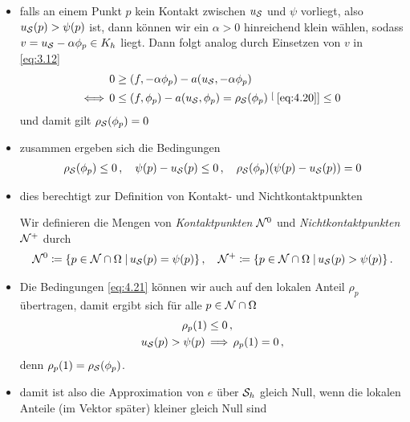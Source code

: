 \begin{itemize}
\item falls an einem Punkt $p$ kein Kontakt zwischen $u_{\mathcal S}$ und $\psi$ vorliegt, also $u_{\mathcal S} (p) > \psi(p)$ ist, dann können wir ein $\alpha > 0$ hinreichend klein wählen, sodass $v = u_{\mathcal S} - \alpha \phi_p \in K_h$ liegt. Dann folgt analog durch Einsetzen von $v$ in \eqref{eq:3.12}
\begin{align*}
	0 & \ge (f,-\alpha \phi_p) - a(u_{\mathcal S},-\alpha\phi_p) \\
	\Longleftrightarrow \, 0 & \le (f,\phi_p) - a(u_{\mathcal S},\phi_p) = \rho_{\mathcal S} (\phi_p) \stackrel[\scriptsize\eqref{eq:4.20}]{}\le 0
\end{align*}
und damit gilt $\rho_{\mathcal S} (\phi_p) = 0$

\item zusammen ergeben sich die Bedingungen
\begin{align}\label{eq:4.21}
	\rho_{\mathcal S} (\phi_p) \le 0 \, , \quad \psi(p)-u_{\mathcal S} (p) \le 0 \, , \quad \rho_{\mathcal S} (\phi_p) (\psi(p)-u_{\mathcal S} (p)) = 0
\end{align}

\item dies berechtigt zur Definition von Kontakt- und Nichtkontaktpunkten
\begin{defi}
Wir definieren die Mengen von \textit{Kontaktpunkten} $\mathcal N^0$ und \textit{Nichtkontaktpunkten} $\mathcal N^+$ durch
\begin{align*}
	\mathcal N^0 \coloneqq  \{p \in \mathcal N \cap \Omega \;\vert\, u_{\mathcal S}(p) = \psi (p) \} \, , \quad 
	\mathcal N^+ \coloneqq  \{p \in \mathcal N \cap \Omega \;\vert\, u_{\mathcal S}(p) > \psi (p) \}\, .
\end{align*}
\end{defi}

\item 
\begin{bem}
Die Bedingungen \eqref{eq:4.21} können wir auch auf den lokalen Anteil $\rho_p$ übertragen, damit ergibt sich für alle $p \in \mathcal N \cap \Omega$
\begin{subequations}\label{eq:4.22}
\begin{align}\label{eq:4.22a}
	\rho_p(1) &  \le 0\, ,  \\
	\label{eq:4.22b}
	u_{\mathcal S} (p) > \psi (p) \, & \Longrightarrow \, \rho_p(1) =0 \, ,
\end{align}
\end{subequations}
denn $\rho_p (1) = \rho_{\mathcal S} (\phi_p)$.
\end{bem}

\item damit ist also die Approximation von $e$ über $\mathcal S_h$ gleich Null, wenn die lokalen Anteile (im Vektor später) kleiner gleich Null sind

\end{itemize}







